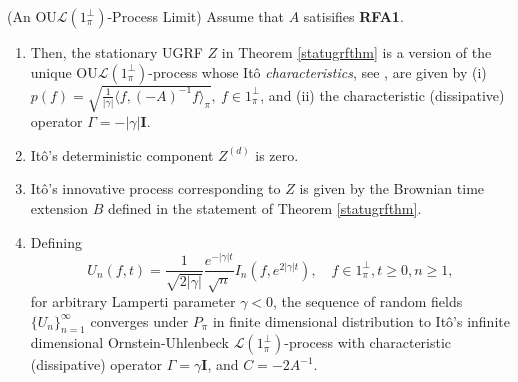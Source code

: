 \documentclass[11pt]{article}
\numberwithin{equation}{section}
\theoremstyle{definition}
\theoremstyle{remark}
\theoremstyle{definition}
\begin{document}
\begin{thm}{(An OU$\mathcal{L}(1_\pi^\perp)$-Process Limit)}
\label{itolimit}
Assume that $A$ satisifies {\bf RFA1}.
\begin{enumerate}
\item{} Then, the stationary UGRF $Z$ 
 in Theorem \ref{statugrfthm} is a version of the unique
OU$\mathcal{L}(1_\pi^\perp)$-process
whose It\^o {\it characteristics}, see \cite{ito},
 are given by
 (i) $p(f) = \sqrt{ \frac{1}{|\gamma|}
\langle f,(-A)^{-1}f\rangle_\pi},\  f\in1_\pi^\perp$,
and (ii) the characteristic (dissipative) operator $\Gamma = -|\gamma|{\mathbf I}$.
\item{} It\^o's deterministic component 
$Z^{(d)}$ is zero. 
\item{} It\^o's innovative process corresponding
to $Z$ is given by the Brownian time extension
$B$ defined in the statement of 
Theorem \ref{statugrfthm}.
\item{} Defining
\begin{equation}
U_n(f,t) = \frac{1}{\sqrt{2|\gamma|}}
\frac{e^{-|\gamma|t}}{\sqrt{n}}I_n(f,e^{2|\gamma|t}),\quad f\in 1_\pi^\perp, t\ge 0,
n\ge 1, 
\end{equation}
for arbitrary Lamperti parameter $\gamma<0$,
 the sequence of random fields
 $\{U_n\}_{n=1}^\infty$ converges under $P_\pi$ in
  finite dimensional distribution to 
It\^o's infinite dimensional Ornstein-Uhlenbeck 
$\mathcal{L}(1^\perp_\pi)$-process with characteristic
(dissipative) operator
$\Gamma =\gamma{\mathbf I}$, and $C=-2A^{-1}$. 
\end{enumerate}
\end{thm}
\end{document}
